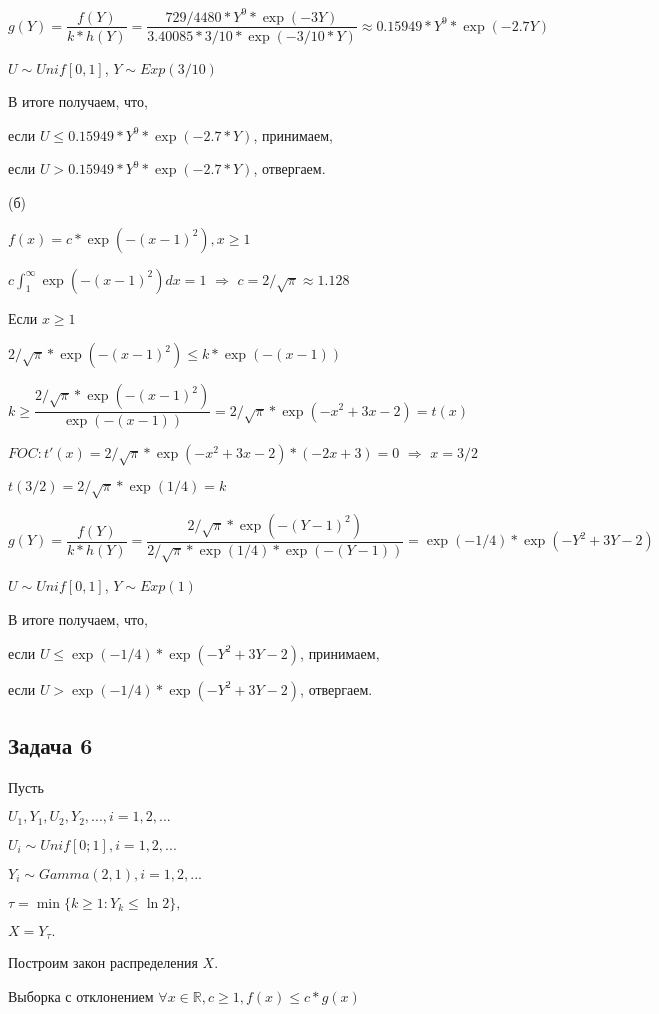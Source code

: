 \documentclass[a4paper,12pt]{article} %
\begin{document}
$g(Y) =\dfrac{f(Y)}{k*h(Y)} = \dfrac{729/4480 * Y^9 * \exp(-3Y)  }{3.40085 * 3/10 * \exp(-3/10*Y)} \approx 0.15949  *  Y^9 *\exp(-2.7Y) $

$U\sim Unif[0,1]$,
$Y \sim Exp(3/10)$

В итоге получаем, что,

если $U\leq  0.15949  *  Y^9 *\exp(-2.7*Y)$,  принимаем, 

если $U >  0.15949  *  Y^9 *\exp(-2.7*Y) $,  отвергаем.


(б)

$f(x) = c* \exp(-(x-1)^2), x\geq1$


$c\int_{1}^{\infty} \exp(-(x-1)^2) dx =1 $ $\Rightarrow$ $c=2/\sqrt{\pi} \approx 1.128$

Если $x\geq 1$

$2/\sqrt{\pi}  *  \exp(-(x-1)^2) \leq k*\exp(-(x-1)) $

$k\geq \dfrac{2/\sqrt{\pi}  *  \exp(-(x-1)^2)}{\exp(-(x-1))}   =  2/\sqrt{\pi}  *  \exp(-x^2+3x-2) = t(x)$

$FOC: t'(x) = 2/\sqrt{\pi} * \exp(-x^2+3x-2) * (-2x+3) = 0 $ $\Rightarrow$ $x=3/2$

$t(3/2) = 2/\sqrt{\pi}  *  \exp(1/4) = k$

$g(Y) =\dfrac{f(Y)}{k*h(Y)} = \dfrac{2/\sqrt{\pi}  *  \exp(-(Y-1)^2)  }{2/\sqrt{\pi}*  \exp(1/4)  *  \exp(-(Y-1))} =  \exp(-1/4)  *  \exp(-Y^2+3Y-2) $

$U\sim Unif[0,1]$,
$Y \sim Exp(1)$


В итоге получаем, что,

если $U\leq \exp(-1/4)  *  \exp(-Y^2+3Y-2)$,  принимаем, 

если $U > \exp(-1/4)  *  \exp(-Y^2+3Y-2) $,  отвергаем.

\subsection*{Задача 6}

Пусть

$U_1, Y_1,  U_2, Y_2, ... , i=1,2,...$

$U_i \sim  Unif [0;1], i=1,2,... $

$Y_i \sim Gamma(2,1), i=1,2,...$

$\tau = \min \{ k\geq 1: Y_k \leq \ln 2 \}, $

$X = Y_{\tau}.  $

Построим закон распределения $X$.


Выборка с отклонением $\forall x \in \mathbb{R}, c\geq 1, f(x)\leq c*g(x)  $
\end{document}

